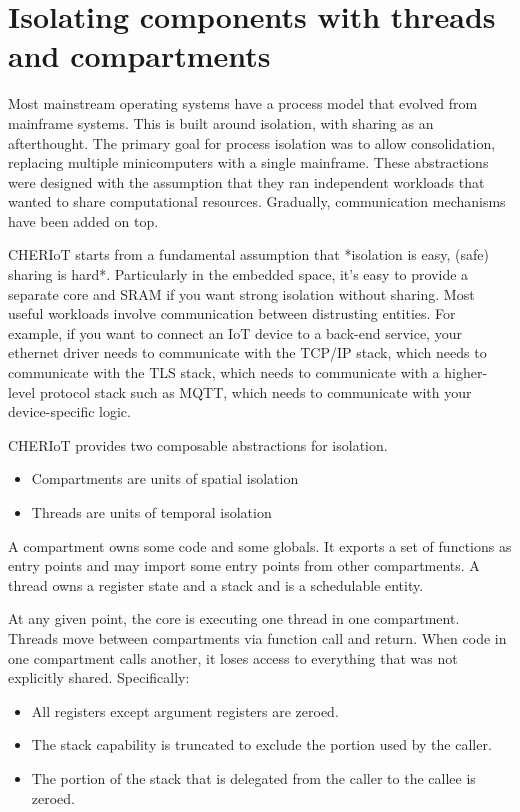 \section{Isolating components with threads and compartments}

Most mainstream operating systems have a process model that evolved from mainframe systems.
This is built around isolation, with sharing as an afterthought.
The primary goal for process isolation was to allow consolidation, replacing multiple minicomputers with a single mainframe.
These abstractions were designed with the assumption that they ran independent workloads that wanted to share computational resources.
Gradually, communication mechanisms have been added on top.

CHERIoT starts from a fundamental assumption that *isolation is easy, (safe) sharing is hard*.
Particularly in the embedded space, it's easy to provide a separate core and SRAM if you want strong isolation without sharing.
Most useful workloads involve communication between distrusting entities.
For example, if you want to connect an IoT device to a back-end service, your ethernet driver needs to communicate with the TCP/IP stack, which needs to communicate with the TLS stack, which needs to communicate with a higher-level protocol stack such as MQTT, which needs to communicate with your device-specific logic.

CHERIoT provides two composable abstractions for isolation.

\begin{itemize}
	\item{Compartments are units of spatial isolation}
	\item{Threads are units of temporal isolation}
\end{itemize}

A compartment owns some code and some globals.
It exports a set of functions as entry points and may import some entry points from other compartments.
A thread owns a register state and a stack and is a schedulable entity.

At any given point, the core is executing one thread in one compartment.
Threads move between compartments via function call and return.
When code in one compartment calls another, it loses access to everything that was not explicitly shared.
Specifically:

\begin{itemize}
	\item{All registers except argument registers are zeroed.}
	\item{The stack capability is truncated to exclude the portion used by the caller.}
	\item{The portion of the stack that is delegated from the caller to the callee is zeroed.}
\end{itemize}

